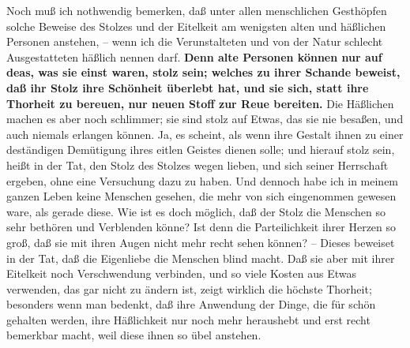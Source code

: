 Noch muß ich nothwendig bemerken, daß unter allen menschlichen Gesthöpfen solche
Beweise des Stolzes und der Eitelkeit am wenigsten  alten und häßlichen Personen
anstehen, -- wenn ich die Verunstalteten und von der Natur schlecht
Ausgestatteten häßlich nennen darf. \textbf{Denn alte Personen können nur auf
deas, was
sie einst waren, stolz sein; welches zu ihrer Schande beweist, daß ihr Stolz
ihre Schönheit überlebt hat, und sie sich, statt ihre Thorheit zu bereuen, nur
neuen Stoff zur Reue bereiten.} Die Häßlichen machen es aber noch schlimmer; sie
sind stolz auf Etwas, das sie nie besaßen, und auch niemals erlangen können. Ja,
es scheint, als wenn ihre Gestalt ihnen zu einer deständigen Demütigung ihres
eitlen Geistes dienen solle; und hierauf stolz sein, heißt in der Tat, den
Stolz des Stolzes wegen lieben, und sich seiner Herrschaft ergeben, ohne eine
Versuchung dazu zu haben. Und dennoch habe ich in meinem ganzen Leben keine
Menschen gesehen, die mehr von sich eingenommen gewesen ware, als gerade diese.
Wie ist es doch möglich, daß der Stolz die Menschen so sehr bethören und
Verblenden könne? Ist denn die Parteilichkeit ihrer Herzen so groß, daß sie mit
ihren Augen nicht mehr recht sehen können? -- Dieses beweiset in der Tat, daß
die Eigenliebe die Menschen blind macht. Daß sie aber mit ihrer Eitelkeit noch
Verschwendung verbinden, und so viele Kosten aus Etwas verwenden, das gar nicht
zu ändern ist, zeigt wirklich die höchste Thorheit; besonders wenn man bedenkt,
daß ihre Anwendung der Dinge, die für schön gehalten werden, ihre Häßlichkeit
nur noch mehr heraushebt und erst recht bemerkbar macht, weil diese ihnen so
übel anstehen.

\medskip

